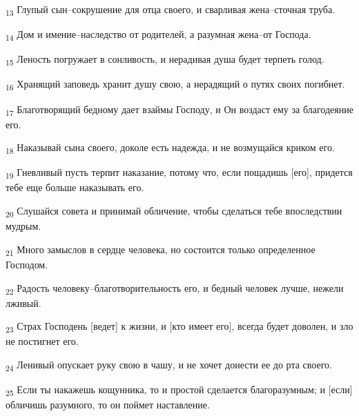 \begin{tcolorbox}
\textsubscript{13} Глупый сын--сокрушение для отца своего, и сварливая жена--сточная труба.
\end{tcolorbox}
\begin{tcolorbox}
\textsubscript{14} Дом и имение--наследство от родителей, а разумная жена--от Господа.
\end{tcolorbox}
\begin{tcolorbox}
\textsubscript{15} Леность погружает в сонливость, и нерадивая душа будет терпеть голод.
\end{tcolorbox}
\begin{tcolorbox}
\textsubscript{16} Хранящий заповедь хранит душу свою, а нерадящий о путях своих погибнет.
\end{tcolorbox}
\begin{tcolorbox}
\textsubscript{17} Благотворящий бедному дает взаймы Господу, и Он воздаст ему за благодеяние его.
\end{tcolorbox}
\begin{tcolorbox}
\textsubscript{18} Наказывай сына своего, доколе есть надежда, и не возмущайся криком его.
\end{tcolorbox}
\begin{tcolorbox}
\textsubscript{19} Гневливый пусть терпит наказание, потому что, если пощадишь [его], придется тебе еще больше наказывать его.
\end{tcolorbox}
\begin{tcolorbox}
\textsubscript{20} Слушайся совета и принимай обличение, чтобы сделаться тебе впоследствии мудрым.
\end{tcolorbox}
\begin{tcolorbox}
\textsubscript{21} Много замыслов в сердце человека, но состоится только определенное Господом.
\end{tcolorbox}
\begin{tcolorbox}
\textsubscript{22} Радость человеку--благотворительность его, и бедный человек лучше, нежели лживый.
\end{tcolorbox}
\begin{tcolorbox}
\textsubscript{23} Страх Господень [ведет] к жизни, и [кто имеет его], всегда будет доволен, и зло не постигнет его.
\end{tcolorbox}
\begin{tcolorbox}
\textsubscript{24} Ленивый опускает руку свою в чашу, и не хочет донести ее до рта своего.
\end{tcolorbox}
\begin{tcolorbox}
\textsubscript{25} Если ты накажешь кощунника, то и простой сделается благоразумным; и [если] обличишь разумного, то он поймет наставление.
\end{tcolorbox}
